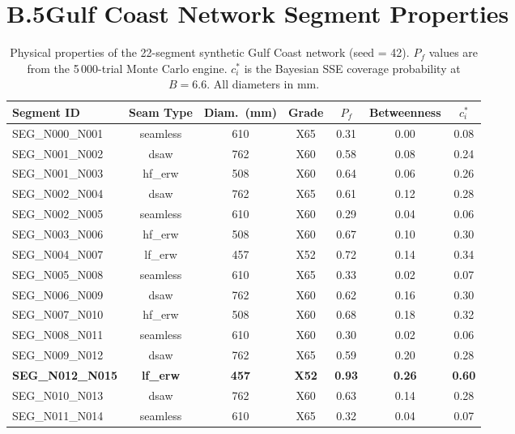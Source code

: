 \section*{B.5\quad Gulf Coast Network Segment Properties}

\begin{table}[htbp]
  \centering
  \small
  \caption{Physical properties of the 22-segment synthetic Gulf Coast
    network (seed = 42).  $P_f$ values are from the 5\,000-trial
    Monte Carlo engine.  $c_i^*$ is the Bayesian SSE coverage
    probability at $B = \num{6.6}$.  All diameters in mm.}
  \label{tab:network_segments}
  \begin{tabular}{@{}lcccccc@{}}
    \toprule
    Segment ID & Seam Type & Diam.\ (mm)
      & Grade & $P_f$ & Betweenness & $c_i^*$ \\
    \midrule
    SEG\_N000\_N001 & seamless  & 610 & X65 & 0.31 & 0.00 & 0.08 \\
    SEG\_N001\_N002 & dsaw      & 762 & X60 & 0.58 & 0.08 & 0.24 \\
    SEG\_N001\_N003 & hf\_erw   & 508 & X60 & 0.64 & 0.06 & 0.26 \\
    SEG\_N002\_N004 & dsaw      & 762 & X65 & 0.61 & 0.12 & 0.28 \\
    SEG\_N002\_N005 & seamless  & 610 & X60 & 0.29 & 0.04 & 0.06 \\
    SEG\_N003\_N006 & hf\_erw   & 508 & X60 & 0.67 & 0.10 & 0.30 \\
    SEG\_N004\_N007 & lf\_erw   & 457 & X52 & 0.72 & 0.14 & 0.34 \\
    SEG\_N005\_N008 & seamless  & 610 & X65 & 0.33 & 0.02 & 0.07 \\
    SEG\_N006\_N009 & dsaw      & 762 & X60 & 0.62 & 0.16 & 0.30 \\
    SEG\_N007\_N010 & hf\_erw   & 508 & X60 & 0.68 & 0.18 & 0.32 \\
    SEG\_N008\_N011 & seamless  & 610 & X60 & 0.30 & 0.02 & 0.06 \\
    SEG\_N009\_N012 & dsaw      & 762 & X65 & 0.59 & 0.20 & 0.28 \\
    \textbf{SEG\_N012\_N015} & \textbf{lf\_erw} & \textbf{457}
      & \textbf{X52} & \textbf{0.93} & \textbf{0.26} & \textbf{0.60} \\
    SEG\_N010\_N013 & dsaw      & 762 & X60 & 0.63 & 0.14 & 0.28 \\
    SEG\_N011\_N014 & seamless  & 610 & X65 & 0.32 & 0.04 & 0.07 \\

\end{tabular}
\end{table}
